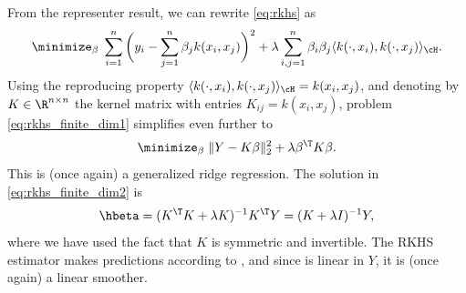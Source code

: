 \documentclass{article}
\begin{document}
From the representer result, we can rewrite \eqref{eq:rkhs} as
\begin{equation}
\label{eq:rkhs_finite_dim1}
\minimize_\beta \; \sum_{i=1}^n \bigg( y_i - \sum_{j=1}^n \beta_j k(x_i, x_j) 
\bigg)^2 + \lambda \sum_{i,j=1}^n \beta_i \beta_j \langle k(\cdot, x_i) ,
k(\cdot, x_j) \rangle_\cH.
\end{equation}
Using the reproducing property $\langle k(\cdot, x_i), k(\cdot, x_j) \rangle_\cH
= k(x_i, x_j)$, and denoting by $K \in \R^{n \times n}$ the kernel matrix with
entries $K_{ij} = k(x_i, x_j)$, problem \eqref{eq:rkhs_finite_dim1} simplifies
even further to
\begin{equation}
\label{eq:rkhs_finite_dim2}
\minimize_\beta \; \|Y - K\beta\|_2^2 + \lambda \beta^\T K \beta.
\end{equation}
This is (once again) a generalized ridge regression. The solution in
\eqref{eq:rkhs_finite_dim2} is 
\[
\hbeta = (K^\T K + \lambda K)^{-1} K^\T Y = (K + \lambda I)^{-1} Y,
\]
where we have used the fact that $K$ is symmetric and invertible. The RKHS
estimator makes predictions according to , and since \smash{$\hbeta$} is linear in $Y$, it is (once again) a
linear smoother. 



\end{document}
